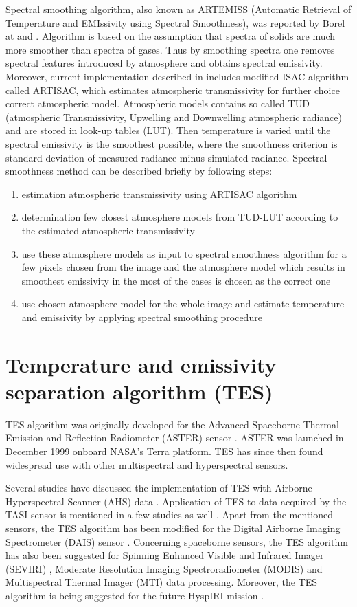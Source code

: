 Spectral smoothing algorithm, also known as ARTEMISS (Automatic Retrieval of Temperature and EMIssivity using Spectral Smoothness), was reported by Borel at \cite{B98} and \cite{B08}. Algorithm is based on the assumption that spectra of solids are much more smoother than spectra of gases. Thus by smoothing spectra one removes spectral features introduced by atmosphere and obtains spectral emissivity. Moreover, current implementation described in \cite{B08} includes modified ISAC algorithm called ARTISAC, which estimates atmospheric transmissivity for further choice correct atmospheric model. Atmospheric models contains so called TUD (atmospheric Transmissivity, Upwelling and Downwelling atmospheric radiance) and are stored in look-up tables (LUT). Then temperature is varied until the spectral emissivity is the smoothest possible, where the smoothness criterion is standard deviation of measured radiance minus simulated radiance. Spectral smoothness method can be described briefly by following steps:
\begin{enumerate}
	\item estimation atmospheric transmissivity using ARTISAC algorithm
	\item determination few closest atmosphere models from TUD-LUT according to the estimated atmospheric transmissivity
	\item use these atmosphere models as input to spectral smoothness algorithm for a few pixels chosen from the image and the atmosphere model which results in smoothest emissivity in the most of the cases is chosen as the correct one
	\item use chosen atmosphere model for the whole image and estimate temperature and emissivity by applying spectral smoothing procedure
\end{enumerate}

\section*{Temperature and emissivity separation algorithm (TES)}

TES algorithm was originally developed for the Advanced Spaceborne Thermal Emission and Reflection Radiometer (ASTER) sensor \cite{GR98}. ASTER was launched in December 1999 onboard NASA's Terra platform. TES has since then found widespread use with other multispectral and hyperspectral sensors.

Several studies have discussed the implementation of TES with Airborne Hyperspectral Scanner (AHS) data \cite{SJ06, JS12}. Application of TES to data acquired by the TASI sensor is mentioned in a few studies as well \cite{WX11, PP12}. Apart from the mentioned sensors, the TES algorithm has been modified for the Digital Airborne Imaging Spectrometer (DAIS) sensor \cite{SJ02}. Concerning spaceborne sensors, the TES algorithm has also been suggested for Spinning Enhanced Visible and Infrared Imager (SEVIRI) \cite{JS14}, Moderate Resolution Imaging Spectroradiometer (MODIS) \cite{HH11} and Multispectral Thermal Imager (MTI) \cite{MB02} data processing. Moreover, the TES algorithm is being suggested for the future HyspIRI mission \cite{HH11-2}.

